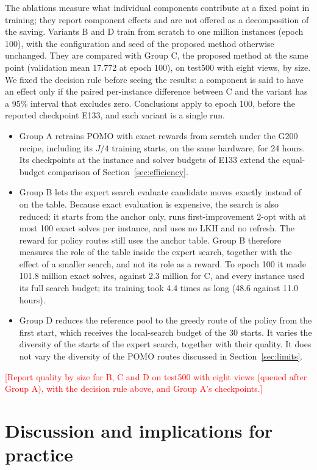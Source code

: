 \documentclass[preprint,12pt,authoryear]{elsarticle}
\newcommand{\placeholder}[1]{\textcolor{red}{[#1]}}
\begin{document}
The ablations measure what individual components contribute at a fixed point in training; they report component effects and are not offered as a decomposition of the saving. Variants B and D train from scratch to one million instances (epoch 100), with the configuration and seed of the proposed method otherwise unchanged. They are compared with Group C, the proposed method at the same point (validation mean 17.772 at epoch 100), on test500 with eight views, by size. We fixed the decision rule before seeing the results: a component is said to have an effect only if the paired per-instance difference between C and the variant has a 95\% interval that excludes zero. Conclusions apply to epoch 100, before the reported checkpoint E133, and each variant is a single run.
\begin{itemize}
\item Group A retrains POMO with exact rewards from scratch under the G200 recipe, including its $J/4$ training starts, on the same hardware, for 24 hours. Its checkpoints at the instance and solver budgets of E133 extend the equal-budget comparison of Section~\ref{sec:efficiency}.
\item Group B lets the expert search evaluate candidate moves exactly instead of on the table. Because exact evaluation is expensive, the search is also reduced: it starts from the anchor only, runs first-improvement 2-opt with at most 100 exact solves per instance, and uses no LKH and no refresh. The reward for policy routes still uses the anchor table. Group B therefore measures the role of the table inside the expert search, together with the effect of a smaller search, and not its role as a reward. To epoch 100 it made 101.8 million exact solves, against 2.3 million for C, and every instance used its full search budget; its training took 4.4 times as long (48.6 against 11.0 hours).
\item Group D reduces the reference pool to the greedy route of the policy from the first start, which receives the local-search budget of the 30 starts. It varies the diversity of the starts of the expert search, together with their quality. It does not vary the diversity of the POMO routes discussed in Section~\ref{sec:limits}.
\end{itemize}
\placeholder{Report quality by size for B, C and D on test500 with eight views (queued after Group A), with the decision rule above, and Group A's checkpoints.}

\section{Discussion and implications for practice}
\label{sec:discussion}
\end{document}
